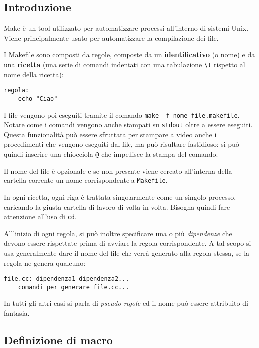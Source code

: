\documentclass[11pt]{article}
\begin{document}
\subsection{Introduzione}

Make è un tool utilizzato per automatizzare processi all'interno di sistemi Unix. Viene principalmente usato per automatizzare la compilazione dei file.

I Makefile sono composti da regole, composte da un \textbf{identificativo} (o nome) e da una \textbf{ricetta} (una serie di comandi indentati con una tabulazione \verb|\t| rispetto al nome della ricetta):

\begin{verbatim}
regola:
    echo "Ciao"
\end{verbatim}

I file vengono poi eseguiti tramite il comando \verb|make -f nome_file.makefile|. Notare come i comandi vengono anche stampati su \verb|stdout| oltre a essere eseguiti. Questa funzionalità può essere sfruttata per stampare a video anche i procedimenti che vengono eseguiti dal file, ma può risultare fastidioso: si può quindi inserire una chiocciola \verb|@| che impedisce la stampa del comando.

Il nome del file è opzionale e se non presente viene cercato all'interna della cartella corrente un nome corrispondente a \verb|Makefile|.

In ogni ricetta, ogni riga è trattata singolarmente come un singolo processo, caricando la giusta cartella di lavoro di volta in volta. Bisogna quindi fare attenzione all'uso di \verb|cd|.

All'inizio di ogni regola, si può inoltre specificare una o più \textit{dipendenze} che devono essere rispettate prima di avviare la regola corrispondente. A tal scopo si usa generalmente dare il nome del file che verrà generato alla regola stessa, se la regola ne genera qualcuno:

\begin{verbatim}
file.cc: dipendenza1 dipendenza2... 
    comandi per generare file.cc...
\end{verbatim}

In tutti gli altri casi si parla di \textit{pseudo-regole} ed il nome può essere attribuito di fantasia.

\subsection{Definizione di macro}
\end{document}
